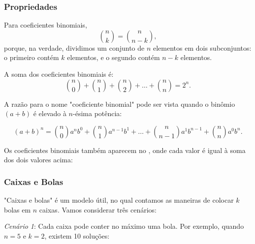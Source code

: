 \subsubsection{Propriedades}

Para coeficientes binomiais,
\[
{n \choose k}  =  {n \choose n-k},
\]
porque, na verdade, dividimos um conjunto de $n$ elementos em
dois subconjuntos: o primeiro contém $k$ elementos,
e o segundo contém $n-k$ elementos.

A soma dos coeficientes binomiais é:
\[
{n \choose 0}+{n \choose 1}+{n \choose 2}+\ldots+{n \choose n}=2^n.
\]

A razão para o nome "coeficiente binomial"
pode ser vista quando o binômio $(a+b)$ é elevado à
$n$-ésima potência:

\[ (a+b)^n =
{n \choose 0} a^n b^0 + 
{n \choose 1} a^{n-1} b^1 +
\ldots + 
{n \choose n-1} a^1 b^{n-1} +
{n \choose n} a^0 b^n. \]


Os coeficientes binomiais também aparecem no
,
onde cada valor é igual à soma dos dois
valores acima:
\begin{center}
\end{center}

\subsubsection{Caixas e Bolas}

"Caixas e bolas" é um modelo útil,
no qual contamos as maneiras de
colocar $k$ bolas em $n$ caixas.
Vamos considerar três cenários:

\textit{Cenário 1}: Cada caixa pode conter
no máximo uma bola.
Por exemplo, quando $n=5$ e $k=2$,
existem 10 soluções:

